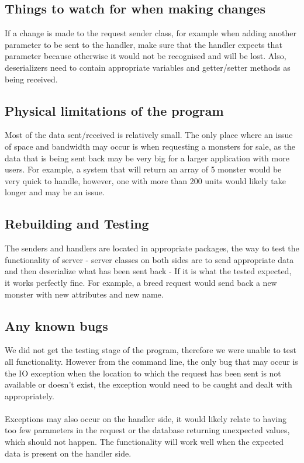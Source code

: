 \documentclass[titlepage]{article}
\begin{document}
{\subsection {Things to watch for when making changes}
If a change is made to the request sender class, for example when adding another parameter to be sent to the handler, make sure that the handler expects that parameter because otherwise it would not be recognised and will be lost. Also, deserializers need to contain appropriate variables and getter/setter methods as being received.
\subsection {Physical limitations of the program}
Most of the data sent/received is relatively small. The only place where an issue of space and bandwidth may occur is when requesting a monsters for sale, as the data that is being sent back may be very big for a larger application with more users. For example, a system that will return an array of 5 monster would be very quick to handle, however, one with more than 200 units would likely take longer and may be an issue.
\subsection {Rebuilding and Testing}
The senders and handlers are located in appropriate packages, the way to test the functionality of server - server classes on both sides are to send appropriate data and then deserialize what has been sent back - If it is what the tested expected, it works perfectly fine. For example, a breed request would send back a new monster with new attributes and new name. 
\subsection {Any known bugs}
We did not get the testing stage of the program, therefore we were unable to test all functionality. However from the command line, the only bug that may occur is the IO exception when the location to which the request has been sent is not available or doesn’t exist, the exception would need to be caught and dealt with appropriately. 
\\
\\
Exceptions may also occur on the handler side, it would likely relate to having too few parameters in the request or the database returning unexpected values, which should not happen. The functionality will work well when the expected data is present on the handler side.
}
\end{document}
